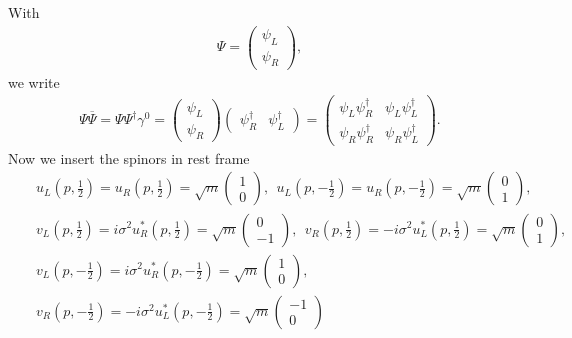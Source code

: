 \documentclass[11pt]{article}
\begin{document}
\section{ }
With
\begin{eqnarray}
    \Psi = 
    \begin{pmatrix}
        \psi_L\\ \psi_R
    \end{pmatrix},
\end{eqnarray}
we write
\begin{eqnarray}
    \Psi {\overline \Psi} = \Psi \Psi^\dagger \gamma^0 =
    \begin{pmatrix}
        \psi_L\\ \psi_R
    \end{pmatrix}
    \begin{pmatrix}
        \psi_R^\dagger & \psi_L^\dagger
    \end{pmatrix}
    =
    \begin{pmatrix}
        \psi_L \psi_R^\dagger & \psi_L\psi_L^\dagger \\
        \psi_R\psi_R^\dagger  & \psi_R\psi_L^\dagger
    \end{pmatrix}.
\end{eqnarray}
Now we insert the spinors in rest frame
\begin{eqnarray}
    &&u_L(p,\frac{1}{2})=u_R(p,\frac{1}{2}) = \sqrt{m}
    \begin{pmatrix}
        1 \\ 0 
    \end{pmatrix}, ~~
    u_L(p,-\frac{1}{2})=u_R(p,-\frac{1}{2}) = \sqrt{m}
    \begin{pmatrix}
        0 \\ 1 
    \end{pmatrix},\\
    &&v_L(p,\frac{1}{2})=i\sigma^2u_R^*(p,\frac{1}{2}) = \sqrt{m}
    \begin{pmatrix}
        0 \\ -1 
    \end{pmatrix},~~
    v_R(p,\frac{1}{2})=-i\sigma^2u_L^*(p,\frac{1}{2}) = \sqrt{m}
    \begin{pmatrix}
        0 \\ 1 
    \end{pmatrix}, \\
    &&v_L(p,-\frac{1}{2})=i\sigma^2u_R^*(p,-\frac{1}{2}) = \sqrt{m}
    \begin{pmatrix}
        1 \\ 0 
    \end{pmatrix},\\
    &&v_R(p,-\frac{1}{2})=-i\sigma^2u_L^*(p,-\frac{1}{2}) = \sqrt{m}
    \begin{pmatrix}
        -1 \\ 0 
    \end{pmatrix}
\end{eqnarray}
\end{document}
